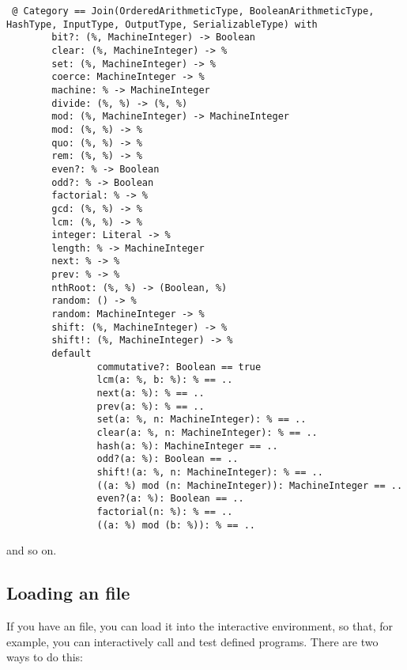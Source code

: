 {\small
\begin{verbatim}
 @ Category == Join(OrderedArithmeticType, BooleanArithmeticType, HashType, InputType, OutputType, SerializableType) with 
        bit?: (%, MachineInteger) -> Boolean
        clear: (%, MachineInteger) -> %
        set: (%, MachineInteger) -> %
        coerce: MachineInteger -> %
        machine: % -> MachineInteger
        divide: (%, %) -> (%, %)
        mod: (%, MachineInteger) -> MachineInteger
        mod: (%, %) -> %
        quo: (%, %) -> %
        rem: (%, %) -> %
        even?: % -> Boolean
        odd?: % -> Boolean
        factorial: % -> %
        gcd: (%, %) -> %
        lcm: (%, %) -> %
        integer: Literal -> %
        length: % -> MachineInteger
        next: % -> %
        prev: % -> %
        nthRoot: (%, %) -> (Boolean, %)
        random: () -> %
        random: MachineInteger -> %
        shift: (%, MachineInteger) -> %
        shift!: (%, MachineInteger) -> %
        default 
                commutative?: Boolean == true
                lcm(a: %, b: %): % == ..
                next(a: %): % == ..
                prev(a: %): % == ..
                set(a: %, n: MachineInteger): % == ..
                clear(a: %, n: MachineInteger): % == ..
                hash(a: %): MachineInteger == ..
                odd?(a: %): Boolean == ..
                shift!(a: %, n: MachineInteger): % == ..
                ((a: %) mod (n: MachineInteger)): MachineInteger == ..
                even?(a: %): Boolean == ..
                factorial(n: %): % == ..
                ((a: %) mod (b: %)): % == ..
\end{verbatim}
}

and so on.

\subsection{Loading an \asharp{} file}

If you have an \asharp{} file, you can load it into the interactive
environment, so that, for example, you can interactively call and test
defined programs. There are two ways to do this:

